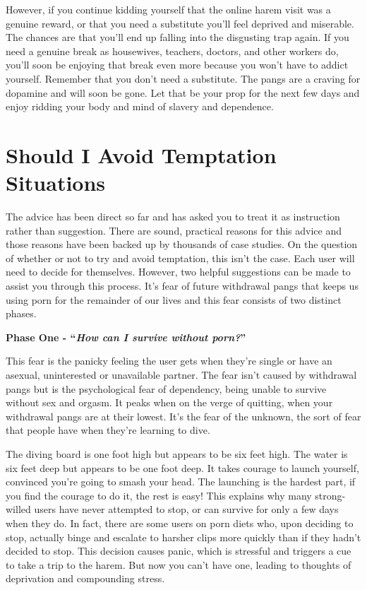 \documentclass[
]{book}
\begin{document}
However, if you continue kidding yourself that the online harem visit was a genuine reward, or that you need a substitute you'll feel deprived and miserable. The chances are that you'll end up falling into the disgusting trap again. If you need a genuine break as housewives, teachers, doctors, and other workers do, you'll soon be enjoying that break even more because you won't have to addict yourself. Remember that you don't need a substitute. The pangs are a craving for dopamine and will soon be gone. Let that be your prop for the next few days and enjoy ridding your body and mind of slavery and dependence.

\hypertarget{should-i-avoid-temptation-situations}{%
\chapter{Should I Avoid Temptation Situations}\label{should-i-avoid-temptation-situations}}

The advice has been direct so far and has asked you to treat it as instruction rather than suggestion. There are sound, practical reasons for this advice and those reasons have been backed up by thousands of case studies. On the question of whether or not to try and avoid temptation, this isn't the case. Each user will need to decide for themselves. However, two helpful suggestions can be made to assist you through this process. It's fear of future withdrawal pangs that keeps us using porn for the remainder of our lives and this fear consists of two distinct phases.

\textbf{Phase One - ``\emph{How can I survive without porn?}''}

This fear is the panicky feeling the user gets when they're single or have an asexual, uninterested or unavailable partner. The fear isn't caused by withdrawal pangs but is the psychological fear of dependency, being unable to survive without sex and orgasm. It peaks when on the verge of quitting, when your withdrawal pangs are at their lowest. It's the fear of the unknown, the sort of fear that people have when they're learning to dive.

The diving board is one foot high but appears to be six feet high. The water is six feet deep but appears to be one foot deep. It takes courage to launch yourself, convinced you're going to smash your head. The launching is the hardest part, if you find the courage to do it, the rest is easy! This explains why many strong-willed users have never attempted to stop, or can survive for only a few days when they do. In fact, there are some users on porn diets who, upon deciding to stop, actually binge and escalate to harsher clips more quickly than if they hadn't decided to stop. This decision causes panic, which is stressful and triggers a cue to take a trip to the harem. But now you can't have one, leading to thoughts of deprivation and compounding stress.
\end{document}
